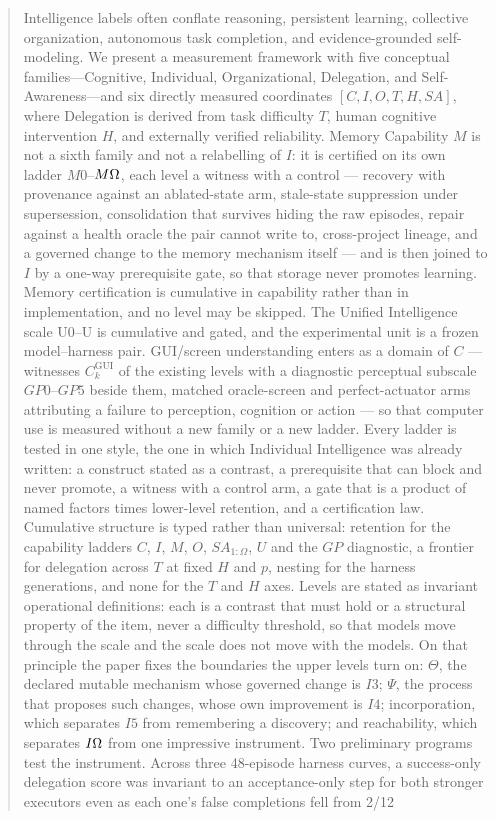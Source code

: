 \maketitle

\begin{abstract}
Intelligence labels often conflate reasoning, persistent learning, collective organization, autonomous task completion, and evidence-grounded self-modeling. We present a measurement framework with five conceptual families---Cognitive, Individual, Organizational, Delegation, and Self-Awareness---and six directly measured coordinates $[C,I,O,T,H,SA]$, where Delegation is derived from task difficulty $T$, human cognitive intervention $H$, and externally verified reliability. Memory Capability $M$ is not a sixth family and not a relabelling of $I$: it is certified on its own ladder $M0$--$M\Om{}$, each level a witness with a control --- recovery with provenance against an ablated-state arm, stale-state suppression under supersession, consolidation that survives hiding the raw episodes, repair against a health oracle the pair cannot write to, cross-project lineage, and a governed change to the memory mechanism itself --- and is then joined to $I$ by a one-way prerequisite gate, so that storage never promotes learning. Memory certification is cumulative in capability rather than in implementation, and no level may be skipped. The Unified Intelligence scale U0--U\Om{} is cumulative and gated, and the experimental unit is a frozen model--harness pair. GUI/screen understanding enters as a domain of $C$ --- witnesses $C^{\mathrm{GUI}}_k$ of the existing levels with a diagnostic perceptual subscale $GP0$--$GP5$ beside them, matched oracle-screen and perfect-actuator arms attributing a failure to perception, cognition or action --- so that computer use is measured without a new family or a new ladder. Every ladder is tested in one style, the one in which Individual Intelligence was already written: a construct stated as a contrast, a prerequisite that can block and never promote, a witness with a control arm, a gate that is a product of named factors times lower-level retention, and a certification law. Cumulative structure is typed rather than universal: retention for the capability ladders $C$, $I$, $M$, $O$, $SA_{1:\Omega}$, $U$ and the $GP$ diagnostic, a frontier for delegation across $T$ at fixed $H$ and $p$, nesting for the harness generations, and none for the $T$ and $H$ axes. Levels are stated as invariant operational definitions: each is a contrast that must hold or a structural property of the item, never a difficulty threshold, so that models move through the scale and the scale does not move with the models. On that principle the paper fixes the boundaries the upper levels turn on: $\Theta$, the declared mutable mechanism whose governed change is $I3$; $\Psi$, the process that proposes such changes, whose own improvement is $I4$; incorporation, which separates $I5$ from remembering a discovery; and reachability, which separates $I\Om{}$ from one impressive instrument. Two preliminary programs test the instrument. Across three 48-episode harness curves, a success-only delegation score was invariant to an acceptance-only step for both stronger executors even as each one's false completions fell from 2/12 
\end{abstract}
